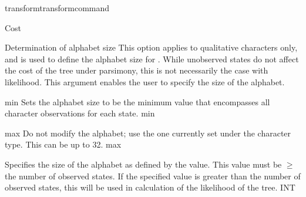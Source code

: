 \begin{command}{transform}{transformcommand}
\begin{arguments}
\begin {argumentgroup} {Cost}
        \end{argumentgroup}
             
                     
        \begin{argumentgroup}{Determination of alphabet size}
            This option applies to qualitative characters only, and is used to
            define the alphabet size for . While unobserved 
            states do not affect the cost of the tree under parsimony, this is not 
            necessarily the case with likelihood. 
            This argument enables the user to specify the size of the alphabet.

             {\obligatory min}
                {Sets the alphabet size to be the minimum value that
                encompasses all character observations for each state.}
                {min}

             {\obligatory max}
                {Do not modify the alphabet; use the one currently
                set under the character type. This can be up to 32.}%
                {max}

             {\obligatory{\poyint}}
                {Specifies the size of the alphabet as defined by the \poyint value. 
                This value must be $ \geq $ the number of observed states.
               If the specified value is greater than the number of observed states, 
                this \poyint will be used in  calculation of the likelihood of the tree.}
                {INT}

        \end{argumentgroup}


\end{arguments}
\end{command}
